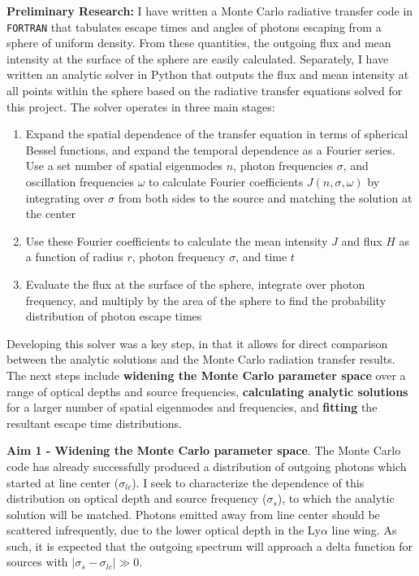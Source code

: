 \documentclass[11pt]{article}
\begin{document}
\textbf{Preliminary Research:} I have written a Monte Carlo radiative transfer code in \texttt{FORTRAN} that tabulates escape times and angles of photons escaping from a sphere of uniform density. From these quantities, the outgoing flux and mean intensity at the surface of the sphere are easily calculated. Separately, I have written an analytic solver in Python that outputs the flux and mean intensity at all points within the sphere based on the radiative transfer equations solved for this project. The solver operates in three main stages:
\begin{enumerate}[itemsep=-0.15cm, topsep=0cm]
    \item Expand the spatial dependence of the transfer equation in terms of spherical Bessel functions, and expand the temporal dependence as a Fourier series. Use a set number of spatial eigenmodes $n$, photon frequencies $\sigma$, and oscillation frequencies $\omega$ to calculate Fourier coefficients $J(n, \sigma, \omega)$ by integrating over $\sigma$ from both sides to the source and matching the solution at the center
    \item Use these Fourier coefficients to calculate the mean intensity $J$ and flux $H$ as a function of radius $r$, photon frequency $\sigma$, and time $t$
    \item Evaluate the flux at the surface of the sphere, integrate over photon frequency, and multiply by the area of the sphere to find the probability distribution of photon escape times
\end{enumerate}

Developing this solver was a key step, in that it allows for direct comparison between the analytic solutions and the Monte Carlo radiation transfer results. The next steps include \textbf{widening the Monte Carlo parameter space} over a range of optical depths and source frequencies, \textbf{calculating analytic solutions} for a larger number of spatial eigenmodes and frequencies, and \textbf{fitting} the resultant escape time distributions.

\noindent \textbf{Aim 1 - Widening the Monte Carlo parameter space}. The Monte Carlo code has already successfully produced a distribution of outgoing photons which started at line center ($\sigma_{lc}$). I seek to characterize the dependence of this distribution on optical depth and source frequency ($\sigma_s$), to which the analytic solution will be matched. Photons emitted away from line center should be scattered infrequently, due to the lower optical depth in the Ly$\alpha$ line wing. As such, it is expected that the outgoing spectrum will approach a delta function for sources with $|\sigma_{s} - \sigma_{lc}| \gg 0$.
\end{document}
